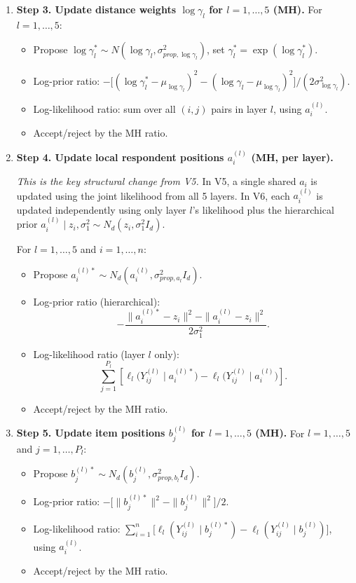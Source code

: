 \documentclass[11pt]{article}
\begin{document}
\begin{enumerate}[leftmargin=1.8em]
    \item \textbf{Step 3. Update distance weights $\log \gamma_l$ for $l=1,\dots,5$ (MH).}
    For $l=1,\dots,5$:
    \begin{itemize}[leftmargin=1.5em]
        \item Propose $\log \gamma_l^*\sim N(\log \gamma_l,\sigma_{prop,\log \gamma_l}^2)$, set $\gamma_l^*=\exp(\log \gamma_l^*)$.
        \item Log-prior ratio:
        $-\bigl[(\log \gamma_l^*-\mu_{\log \gamma_l})^2-(\log \gamma_l-\mu_{\log \gamma_l})^2\bigr]/(2\sigma_{\log \gamma_l}^2)$.
        \item Log-likelihood ratio: sum over all $(i,j)$ pairs in layer $l$, using $a_i^{(l)}$.
        \item Accept/reject by the MH ratio.
    \end{itemize}

    \item \textbf{Step 4. Update local respondent positions $a_i^{(l)}$ (MH, per layer).}

    \textit{This is the key structural change from V5.} In V5, a single shared $a_i$ is updated using the joint likelihood from all 5 layers. In V6, each $a_i^{(l)}$ is updated independently using only layer $l$'s likelihood plus the hierarchical prior $a_i^{(l)} \mid z_i, \sigma_1^2 \sim N_d(z_i, \sigma_1^2 I_d)$.

    For $l=1,\dots,5$ and $i=1,\dots,n$:
    \begin{itemize}[leftmargin=1.5em]
        \item Propose $a_i^{(l)*}\sim N_d(a_i^{(l)},\sigma_{prop,a_l}^2 I_d)$.
        \item Log-prior ratio (hierarchical):
        \[
        -\frac{\|a_i^{(l)*} - z_i\|^2 - \|a_i^{(l)} - z_i\|^2}{2\sigma_1^2}.
        \]
        \item Log-likelihood ratio (layer $l$ only):
        \[
        \sum_{j=1}^{P_l}
        \left[\ell_l\bigl(Y_{ij}^{(l)}\mid a_i^{(l)*}\bigr)-\ell_l\bigl(Y_{ij}^{(l)}\mid a_i^{(l)}\bigr)\right].
        \]
        \item Accept/reject by the MH ratio.
    \end{itemize}

    \item \textbf{Step 5. Update item positions $b_j^{(l)}$ for $l=1,\dots,5$ (MH).}
    For $l=1,\dots,5$ and $j=1,\dots,P_l$:
    \begin{itemize}[leftmargin=1.5em]
        \item Propose $b_j^{(l)*}\sim N_d(b_j^{(l)},\sigma_{prop,b_l}^2 I_d)$.
        \item Log-prior ratio:
        $-\bigl[\|b_j^{(l)*}\|^2-\|b_j^{(l)}\|^2\bigr]/2$.
        \item Log-likelihood ratio:
        $\sum_{i=1}^{n}\bigl[\ell_l(Y_{ij}^{(l)}\mid b_j^{(l)*})-\ell_l(Y_{ij}^{(l)}\mid b_j^{(l)})\bigr]$, using $a_i^{(l)}$.
        \item Accept/reject by the MH ratio.
    \end{itemize}


\end{enumerate}
\end{document}

